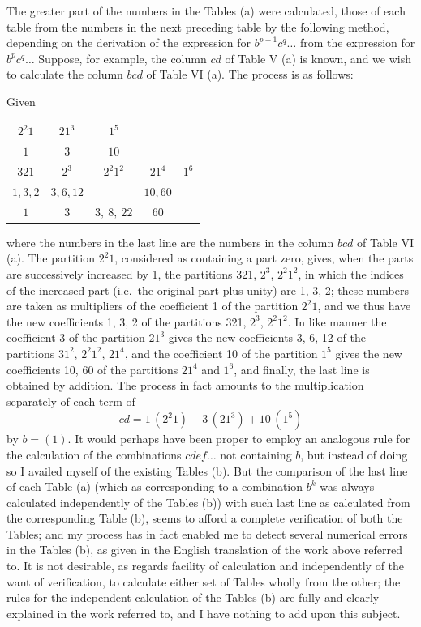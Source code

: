 \documentclass[11pt]{article}
\begin{document}
The greater part of the numbers in the Tables (a) were calculated, those of each table from the numbers in the next preceding table by the following method, depending on the derivation of the expression for $b^{p+1} c^q\ldots$ from the expression for $b^p c^q\ldots$ Suppose, for example, the column $cd$ of Table V (a) is known, and we wish to calculate the column $bcd$ of Table VI (a). The process is as follows:

\medskip

\noindent Given
\begin{center}
\begin{tabular}{ccccc}
$2^2 1$ & $21^3$ & $1^5$ & & \\
$1$ & $3$ & $10$ & & \\
\hline
$321$ & $2^3$ & $2^2 1^2$ & $21^4$ & $1^6$ \\
$1, 3, 2$ & $3, 6, 12$ & & $10, 60$ & \\
\hline
$1$ & $3$ & $3,\ 8,\ 22$ & $60$ & \\
\end{tabular}
\end{center}

where the numbers in the last line are the numbers in the column $bcd$ of Table VI (a). The partition $2^2 1$, considered as containing a part zero, gives, when the parts are successively increased by 1, the partitions 321, $2^3$, $2^2 1^2$, in which the indices of the increased part (i.e.\ the original part plus unity) are 1, 3, 2; these numbers are taken as multipliers of the coefficient 1 of the partition $2^2 1$, and we thus have the new coefficients 1, 3, 2 of the partitions 321, $2^3$, $2^2 1^2$. In like manner the coefficient 3 of the partition $21^3$ gives the new coefficients 3, 6, 12 of the partitions $31^2$, $2^2 1^2$, $21^4$, and the coefficient 10 of the partition $1^5$ gives the new coefficients 10, 60 of the partitions $21^4$ and $1^6$, and finally, the last line is obtained by addition. The process in fact amounts to the multiplication separately of each term of
\[
cd = 1\,(2^2 1) + 3\,(21^3) + 10\,(1^5)
\]
by $b = (1)$. It would perhaps have been proper to employ an analogous rule for the calculation of the combinations $cd e f\ldots$ not containing $b$, but instead of doing so I availed myself of the existing Tables (b). But the comparison of the last line of each Table (a) (which as corresponding to a combination $b^k$ was always calculated independently of the Tables (b)) with such last line as calculated from the corresponding Table (b), seems to afford a complete verification of both the Tables; and my process has in fact enabled me to detect several numerical errors in the Tables (b), as given in the English translation of the work above referred to. It is not desirable, as regards facility of calculation and independently of the want of verification, to calculate either set of Tables wholly from the other; the rules for the independent calculation of the Tables (b) are fully and clearly explained in the work referred to, and I have nothing to add upon this subject.
\end{document}
